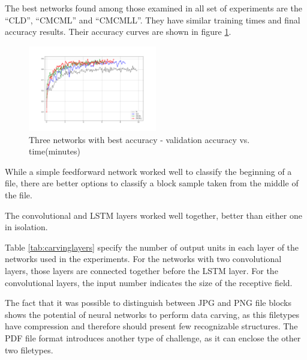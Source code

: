 The best networks found among those examined in all set of experiments are the ``CLD'', ``CMCML'' and ``CMCMLL''. They have similar training times and final accuracy results. Their accuracy curves are shown in figure \ref{fig:bestnets}.

\begin{figure}[htb!]
\centering\includegraphics[width=0.50\textwidth]{content/CL-CLD-CMCML-CMCMLL.png}
\caption[Best networks]{\label{fig:bestnets}Three networks with best accuracy - validation accuracy vs. time(minutes)}
\end{figure}

While a simple feedforward network worked well to classify the beginning of a file, there are better options to classify a block sample taken from the middle of the file.

The convolutional and LSTM layers worked well together, better than either one in isolation.

Table \ref{tab:carvinglayers} specify the number of output units in each layer of the networks used in the experiments. For the networks with two convolutional layers, those layers are connected together before the LSTM layer. For the convolutional layers, the input number indicates the size of the receptive field. 


The fact that it was possible to distinguish between JPG and PNG file blocks shows the potential of neural networks to perform data carving, as this filetypes have compression and therefore should present few recognizable structures. The PDF file format introduces another type of challenge, as it can enclose the other two filetypes. 